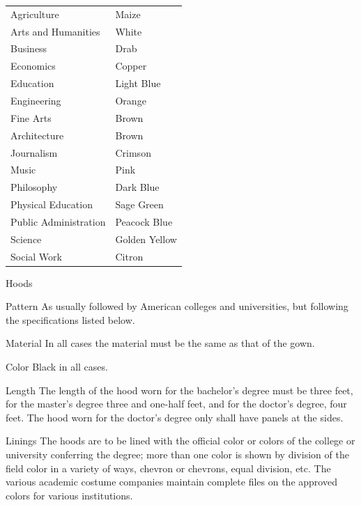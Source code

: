 \documentclass{tufte-handout}
\begin{document}
\begin{margintable}
\begin{tabular}{ll}
Agriculture                     & Maize         \\
Arts and Humanities             & White         \\
Business                           & Drab          \\
Economics                       & Copper        \\
Education                       & Light Blue    \\
Engineering                     & Orange        \\
Fine Arts                       & Brown         \\
Architecture                    & Brown         \\
Journalism                      & Crimson       \\
Music                           & Pink          \\
Philosophy                      & Dark Blue     \\
Physical Education              & Sage Green    \\
Public Administration           & Peacock Blue  \\
Science                         & Golden Yellow \\
Social Work                     & Citron       
\end{tabular}
\end{margintable}


Hoods

Pattern
As usually followed by American colleges and universities, but following the specifications listed below.

Material
In all cases the material must be the same as that of the gown.
 
Color
Black in all cases.
 
Length
The length of the hood worn for the bachelor's degree must be three feet, for the master's degree three and one-half feet, and for the doctor's degree, four feet. The hood worn for the doctor's degree only shall have panels at the sides.
 
Linings
The hoods are to be lined with the official color or colors of the college or university conferring the degree; more than one color is shown by division of the field color in a variety of ways, chevron or chevrons, equal division, etc. The various academic costume companies maintain complete files on the approved colors for various institutions.
 
\end{document}
